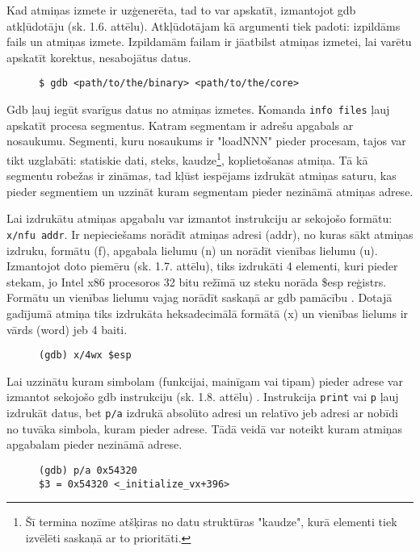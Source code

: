 Kad atmiņas izmete ir uzģenerēta, tad to var apskatīt, izmantojot gdb atkļūdotāju (sk. 1.6. attēlu). 
Atkļūdotājam kā argumenti tiek padoti: izpildāms fails un atmiņas izmete. 
Izpildamām failam ir jāatbilst atmiņas izmetei, lai varētu apskatīt korektus, nesabojātus datus.

\begin{figure}[h]
\begin{lstlisting}
$ gdb <path/to/the/binary> <path/to/the/core>
\end{lstlisting}
\caption{\textbf{\fontsize{11}{12}\selectfont {Atmiņas izmetes atvēršana, izmantojot gdb atkļūdotāju}}}
\end{figure}

Gdb ļauj iegūt svarīgus datus no atmiņas izmetes. Komanda \texttt{info files} ļauj apskatīt procesa segmentus. 
Katram segmentam ir adrešu apgabals ar nosaukumu. 
Segmenti, kuru nosaukums ir "loadNNN" pieder procesam, tajos var tikt uzglabāti: statiskie dati, steks, kaudze\footnote{Šī termina nozīme atšķiras no datu struktūras "kaudze", kurā elementi tiek izvēlēti saskaņā ar to prioritāti.}, koplietošanas atmiņa.
Tā kā segmentu robežas ir zināmas, tad kļūst iespējams izdrukāt atmiņas saturu, kas pieder segmentiem un uzzināt kuram segmentam pieder nezināmā atmiņas adrese.

Lai izdrukātu atmiņas apgabalu var izmantot instrukciju ar sekojošo formātu: \texttt{x/nfu addr}. 
Ir nepieciešams norādīt atmiņas adresi (addr), no kuras sākt atmiņas izdruku, formātu (f), apgabala lielumu (n) un norādīt vienības lielumu (u). 
Izmantojot doto piemēru (sk. 1.7. attēlu), tiks izdrukāti 4 elementi, kuri pieder stekam, jo Intel x86 procesoros 32 bitu režīmā uz steku norāda \$esp reģistrs. 
Formātu un vienības lielumu vajag norādīt saskaņā ar gdb pamācību \cite{gdb}. 
Dotajā gadījumā atmiņa tiks izdrukāta heksadecimālā formātā (x) un vienības lielums ir vārds (word) jeb 4 baiti.
\begin{figure}[h]
\begin{lstlisting}
(gdb) x/4wx $esp
\end{lstlisting}
\caption{\textbf{\fontsize{11}{12}\selectfont {Atmiņas apgabala izdrukāšana}}}
\end{figure}

Lai uzzinātu kuram simbolam (funkcijai, mainīgam vai tipam) pieder adrese var izmantot sekojošo gdb instrukciju (sk. 1.8. attēlu) \cite{gdb}.
Instrukcija \texttt{print} vai \texttt{p} ļauj izdrukāt datus, bet \texttt{p/a} izdrukā absolūto adresi un relatīvo jeb adresi ar nobīdi no tuvāka simbola, kuram pieder adrese.
Tādā veidā var noteikt kuram atmiņas apgabalam pieder nezināmā adrese.
\begin{figure}[h]
\begin{lstlisting}
(gdb) p/a 0x54320
$3 = 0x54320 <_initialize_vx+396>
\end{lstlisting}
\caption{\textbf{\fontsize{11}{12}\selectfont {Noteikšana, kuram simbolam pieder adrese}}}
\end{figure}

